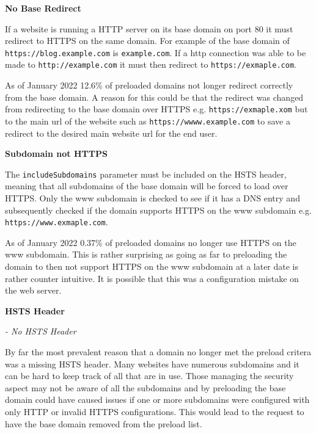 \documentclass{mscreport}
\begin{document}
\vspace{0.5cm} \noindent
\textbf{No Base Redirect}

\vspace{0.3cm} \noindent
If a website is running a HTTP server on its base domain on port 80 it must redirect to HTTPS on the same domain. For example of the base domain of \texttt{https://blog.example.com} is \texttt{example.com}. If a http connection was able to be made to \texttt{http://example.com} it must then redirect to \texttt{https://exmaple.com}.

\vspace{0.3cm} \noindent
As of January 2022 12.6\% of preloaded domains not longer redirect correctly from the base domain. A reason for this could be that the redirect was changed from redirecting to the base domain over HTTPS e.g. \texttt{https://exmaple.xom} but to the main url of the website such as \texttt{https://wwww.example.com} to save a redirect to the desired main website url for the end user.

\vspace{0.5cm} \noindent
\textbf{Subdomain not HTTPS}

\vspace{0.3cm} \noindent
The \texttt{includeSubdomains} parameter must be included on the HSTS header, meaning that all subdomains of the base domain will be forced to load over HTTPS. Only the www subdomain is checked to see if it has a DNS entry and subsequently checked if the domain supports HTTPS on the www subdomain e.g. \texttt{https://www.exmaple.com}.

\vspace{0.3cm} \noindent
As of January 2022 0.37\% of preloaded domains no longer use HTTPS on the www subdomain. This is rather surprising as going as far to preloading the domain to then not support HTTPS on the www subdomain at a later date is rather counter intuitive. It is possible that this was a configuration mistake on the web server.

\vspace{0.5cm} \noindent
\textbf{HSTS Header}

\vspace{0.3cm} \noindent
\textit{- No HSTS Header}

\vspace{0.3cm} \noindent
By far the most prevalent reason that a domain no longer met the preload critera was a missing HSTS header. Many websites have numerous subdomains and it can be hard to keep track of all that are in use. Those managing the security aspect may not be aware of all the subdomains and by preloading the base domain could have caused issues if one or more subdomains were configured with only HTTP or invalid HTTPS configurations. This would lead to the request to have the base domain removed from the preload list.
\end{document}
